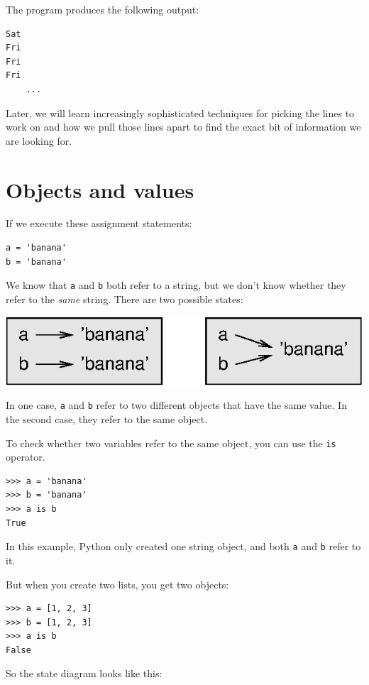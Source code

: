 \documentclass[10pt]{book}
\begin{document}
The program produces the following output:

\beforeverb
\begin{verbatim}
Sat
Fri
Fri
Fri
    ...
\end{verbatim}
\afterverb
%
Later, we will learn increasingly sophisticated techniques for
picking the lines to work on and how we pull those lines apart
to find the exact bit of information we are looking for.

\section{Objects and values}


If we execute these assignment statements:

\beforeverb
\begin{verbatim}
a = 'banana'
b = 'banana'
\end{verbatim}
\afterverb
%
We know that {\tt a} and {\tt b} both refer to a
string, but we don't
know whether they refer to the {\em same} string.
There are two possible states:


\beforefig
\centerline{\includegraphics{figs/list1.eps}}
\afterfig

In one case, {\tt a} and {\tt b} refer to two different objects that
have the same value.  In the second case, they refer to the same
object.


To check whether two variables refer to the same object, you can
use the {\tt is} operator.

\beforeverb
\begin{verbatim}
>>> a = 'banana'
>>> b = 'banana'
>>> a is b
True
\end{verbatim}
\afterverb
%
In this example, Python only created one string object,
and both {\tt a} and {\tt b} refer to it.

But when you create two lists, you get two objects:

\beforeverb
\begin{verbatim}
>>> a = [1, 2, 3]
>>> b = [1, 2, 3]
>>> a is b
False
\end{verbatim}
\afterverb
%
So the state diagram looks like this:
\end{document}
